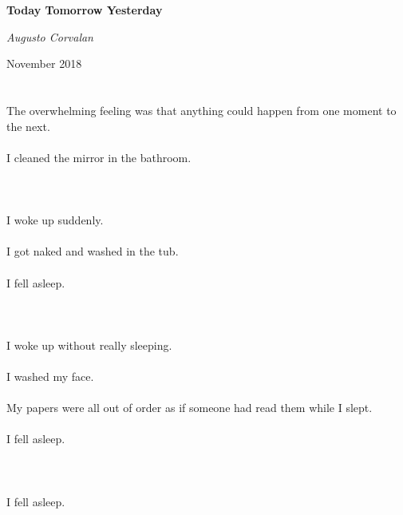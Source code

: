 \documentclass{article}
\begin{document}
    \begin{titlepage}
    \centering
    \vspace{5cm}
    {\huge\bfseries Today Tomorrow Yesterday \par}
    \vspace{2cm}
    {\Large\itshape Augusto Corvalan\par}
    \vfill
    {\large November 2018\par}
    \end{titlepage}

    
    \section{}
    The overwhelming feeling was that anything could happen from one moment to the next.\\\\I cleaned the mirror in the bathroom.\\\\ 
    \newpage
    
    \section{}
    I woke up suddenly.\\\\I got naked and washed in the tub.\\\\I fell asleep.\\\\ 
    \newpage
    
    \section{}
    I woke up without really sleeping.\\\\I washed my face.\\\\My papers were all out of order as if someone had read them while I slept.\\\\I fell asleep.\\\\ 
    \newpage
    
    \section{}
    I fell asleep.\\\\ 
    \newpage
    
\end{document}
